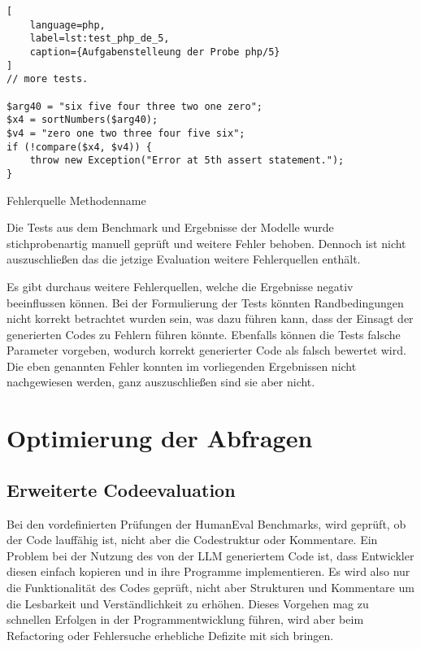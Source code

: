 \begin{lstlisting}[
	language=php,
	label=lst:test_php_de_5,
	caption={Aufgabenstelleung der Probe php/5}
]
// more tests.

$arg40 = "six five four three two one zero";
$x4 = sortNumbers($arg40);
$v4 = "zero one two three four five six";
if (!compare($x4, $v4)) {
    throw new Exception("Error at 5th assert statement.");
}
\end{lstlisting}

Fehlerquelle Methodenname\vspace{0.2cm}

Die Tests aus dem Benchmark und Ergebnisse der Modelle wurde stichprobenartig manuell geprüft und weitere Fehler behoben. Dennoch ist nicht auszuschließen das die jetzige Evaluation weitere Fehlerquellen enthält.\vspace{0.2cm}

Es gibt durchaus weitere Fehlerquellen, welche die Ergebnisse negativ beeinflussen können. Bei der Formulierung der Tests könnten Randbedingungen nicht korrekt betrachtet wurden sein, was dazu führen kann, dass der Einsagt der generierten Codes zu Fehlern führen könnte. Ebenfalls können die Tests falsche Parameter vorgeben, wodurch korrekt generierter Code als falsch bewertet wird. Die eben genannten Fehler konnten im vorliegenden Ergebnissen nicht nachgewiesen werden, ganz auszuschließen sind sie aber nicht.



\section{Optimierung der Abfragen}


\subsection{Erweiterte Codeevaluation}
Bei den vordefinierten Prüfungen der HumanEval Benchmarks, wird geprüft, ob der Code lauffähig ist, nicht aber die Codestruktur oder Kommentare. Ein Problem bei der Nutzung des von der LLM generiertem Code ist, dass Entwickler diesen einfach kopieren und in ihre Programme implementieren. Es wird also nur die Funktionalität des Codes geprüft, nicht aber Strukturen und Kommentare um die Lesbarkeit und Verständlichkeit zu erhöhen. Dieses Vorgehen mag zu schnellen Erfolgen in der Programmentwicklung führen, wird aber beim Refactoring oder Fehlersuche erhebliche Defizite mit sich bringen.\vspace{0.2cm}

